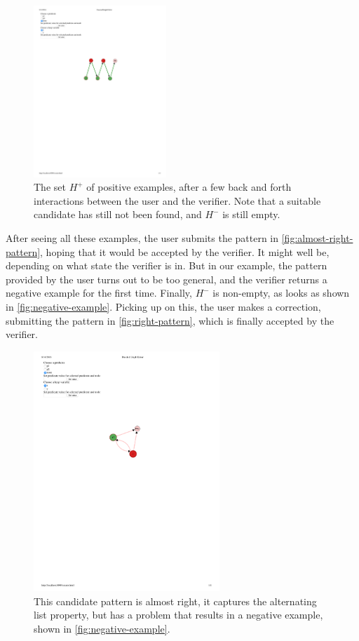 \begin{figure}
  \includegraphics[width=5cm]{fig/positive5.pdf}
  \caption{The set $H^{+}$ of positive examples, after a few back and forth interactions between the user and the verifier. Note that a suitable candidate has still not been found, and $H^{-}$ is still empty.}
  \label{fig:several-positive-examples}
\end{figure}

After seeing all these examples, the user submits the pattern in
\autoref{fig:almost-right-pattern}, hoping that it would be accepted by the verifier. It
might well be, depending on what state the verifier is in. But in our example, the
pattern provided by the user turns out to be too general, and the verifier returns a
negative example for the first time. Finally, $H^{-}$ is non-empty, as looks as shown in
\autoref{fig:negative-example}. Picking up on this, the user makes a correction,
submitting the pattern in \autoref{fig:right-pattern}, which is finally accepted by the
verifier.

\begin{figure}
  \centering
  \includegraphics[width=7cm]{fig/candidate5.pdf}
  \caption{This candidate pattern is almost right, it captures the alternating list property, but has a problem that results in a negative example, shown in \autoref{fig:negative-example}.}
  \label{fig:almost-right-pattern}
\end{figure}

